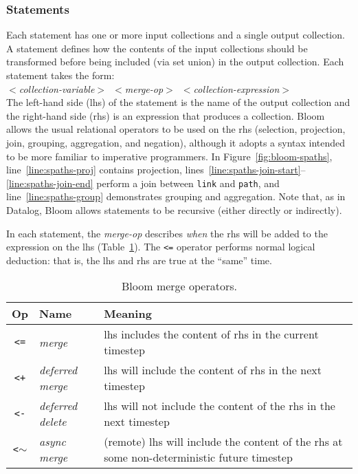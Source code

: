 \subsubsection{Statements}
Each statement has one or more input collections and a single output
collection. A statement defines how the contents of the input collections should
be transformed before being included (via set union) in the output
collection. Each statement takes the form: \\ \noindent
\mbox{\hspace{0.25in}\emph{$<$collection-variable$>$ $<$merge-op$>$
    $<$collection-expression$>$}}\\ \noindent
The left-hand side (lhs) of the statement is the name of the output collection
and the right-hand side (rhs) is an expression that produces a collection. Bloom
allows the usual relational operators to be used on the rhs (selection,
projection, join, grouping, aggregation, and negation), although it adopts a
syntax intended to be more familiar to imperative programmers. In
Figure~\ref{fig:bloom-spaths}, line~\ref{line:spaths-proj} contains projection,
lines~\ref{line:spaths-join-start}--\ref{line:spaths-join-end} perform a join
between \texttt{link} and \texttt{path}, and line~\ref{line:spaths-group}
demonstrates grouping and aggregation. Note that, as in Datalog, Bloom allows
statements to be recursive (either directly or
indirectly). %

In each statement, the \emph{merge-op} describes \emph{when} the rhs will be
added to the expression on the lhs (Table~\ref{tbl:bloom-ops}). The \verb|<=|
operator performs normal logical deduction: that is, the lhs and rhs are true at
the ``same'' time.

\begin{table}
\begin{tabular}{|c|l|p{1.85in}|}
\hline
\textbf{Op} & \textbf{Name} & \textbf{Meaning} \\
\hline
\verb|<=| & \emph{merge} & lhs includes the content of rhs in the
current timestep \\
\hline
\verb|<+| & \emph{deferred merge} & lhs will include the content of rhs in the
next timestep \\
\hline
\verb|<-| & \emph{deferred delete} & lhs will not include the content of the rhs
in the next timestep \\
\hline
\verb|<|$\sim$ & \emph{async merge} & (remote) lhs will include the content of the
rhs at some non-deterministic future timestep\\
\hline
\end{tabular}
\caption{Bloom merge operators.}
\label{tbl:bloom-ops}
\end{table}

